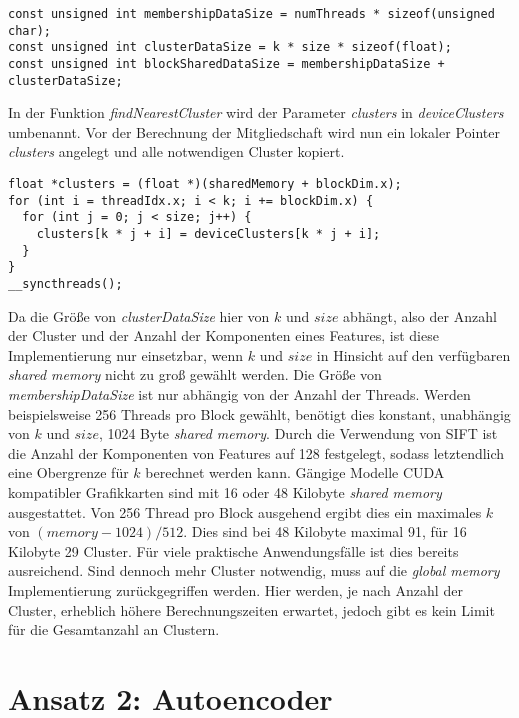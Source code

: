 \lstset{language=C}
\begin{lstlisting}
const unsigned int membershipDataSize = numThreads * sizeof(unsigned char);
const unsigned int clusterDataSize = k * size * sizeof(float);
const unsigned int blockSharedDataSize = membershipDataSize + clusterDataSize;
\end{lstlisting}

In der Funktion \textit{findNearestCluster} wird der Parameter \textit{clusters} in \textit{deviceClusters} umbenannt. Vor der Berechnung der Mitgliedschaft wird nun ein lokaler Pointer \textit{clusters} angelegt und alle notwendigen Cluster kopiert.

\lstset{language=C}
\begin{lstlisting}
float *clusters = (float *)(sharedMemory + blockDim.x);
for (int i = threadIdx.x; i < k; i += blockDim.x) {
  for (int j = 0; j < size; j++) {
    clusters[k * j + i] = deviceClusters[k * j + i];
  }
}
__syncthreads();
\end{lstlisting}

Da die Größe von \textit{clusterDataSize} hier von $k$ und $size$ abhängt, also der Anzahl der Cluster und der Anzahl der Komponenten eines Features, ist diese Implementierung nur einsetzbar, wenn $k$ und $size$ in Hinsicht auf den verfügbaren \textit{shared memory} nicht zu groß gewählt werden. Die Größe von \textit{membershipDataSize} ist nur abhängig von der Anzahl der Threads. Werden beispielsweise 256 Threads pro Block gewählt, benötigt dies konstant, unabhängig von $k$ und $size$, 1024 Byte \textit{shared memory}. Durch die Verwendung von SIFT ist die Anzahl der Komponenten von Features auf 128 festgelegt, sodass letztendlich eine Obergrenze für $k$ berechnet werden kann. Gängige Modelle CUDA kompatibler Grafikkarten sind mit 16 oder 48 Kilobyte \textit{shared memory} ausgestattet. Von 256 Thread pro Block ausgehend ergibt dies ein maximales $k$ von $(memory - 1024) / 512$. Dies sind bei 48 Kilobyte maximal 91, für 16 Kilobyte 29 Cluster. Für viele praktische Anwendungsfälle ist dies bereits ausreichend. Sind dennoch mehr Cluster notwendig, muss auf die \textit{global memory} Implementierung zurückgegriffen werden. Hier werden, je nach Anzahl der Cluster, erheblich höhere Berechnungszeiten erwartet, jedoch gibt es kein Limit für die Gesamtanzahl an Clustern.

\section{Ansatz 2: Autoencoder}

